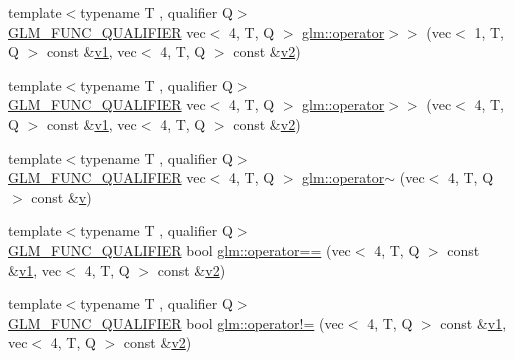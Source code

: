 \begin{DoxyCompactItemize}
\item 
{\footnotesize template$<$typename T , qualifier Q$>$ }\\\mbox{\hyperlink{setup_8hpp_a33fdea6f91c5f834105f7415e2a64407}{G\+L\+M\+\_\+\+F\+U\+N\+C\+\_\+\+Q\+U\+A\+L\+I\+F\+I\+ER}} vec$<$ 4, T, Q $>$ \mbox{\hyperlink{namespaceglm_a30d2494740db3a57a74b7ebe9339b5d0}{glm\+::operator$>$$>$}} (vec$<$ 1, T, Q $>$ const \&\mbox{\hyperlink{_s_d_l__opengl__glext_8h_a435c176a02c061b43e19bdf7c86cceae}{v1}}, vec$<$ 4, T, Q $>$ const \&\mbox{\hyperlink{_s_d_l__opengl__glext_8h_a0928f6d0f0f794ba000a21dfae422136}{v2}})
\item 
{\footnotesize template$<$typename T , qualifier Q$>$ }\\\mbox{\hyperlink{setup_8hpp_a33fdea6f91c5f834105f7415e2a64407}{G\+L\+M\+\_\+\+F\+U\+N\+C\+\_\+\+Q\+U\+A\+L\+I\+F\+I\+ER}} vec$<$ 4, T, Q $>$ \mbox{\hyperlink{namespaceglm_a8cc622e034537762d4d2355a4caeddb2}{glm\+::operator$>$$>$}} (vec$<$ 4, T, Q $>$ const \&\mbox{\hyperlink{_s_d_l__opengl__glext_8h_a435c176a02c061b43e19bdf7c86cceae}{v1}}, vec$<$ 4, T, Q $>$ const \&\mbox{\hyperlink{_s_d_l__opengl__glext_8h_a0928f6d0f0f794ba000a21dfae422136}{v2}})
\item 
{\footnotesize template$<$typename T , qualifier Q$>$ }\\\mbox{\hyperlink{setup_8hpp_a33fdea6f91c5f834105f7415e2a64407}{G\+L\+M\+\_\+\+F\+U\+N\+C\+\_\+\+Q\+U\+A\+L\+I\+F\+I\+ER}} vec$<$ 4, T, Q $>$ \mbox{\hyperlink{namespaceglm_ad0636281215bc27c556dd4f4b990d4ad}{glm\+::operator$\sim$}} (vec$<$ 4, T, Q $>$ const \&\mbox{\hyperlink{_s_d_l__opengl_8h_a10a82eabcb59d2fcd74acee063775f90}{v}})
\item 
{\footnotesize template$<$typename T , qualifier Q$>$ }\\\mbox{\hyperlink{setup_8hpp_a33fdea6f91c5f834105f7415e2a64407}{G\+L\+M\+\_\+\+F\+U\+N\+C\+\_\+\+Q\+U\+A\+L\+I\+F\+I\+ER}} bool \mbox{\hyperlink{namespaceglm_abd1d976d30699701eee8eb2a1544762f}{glm\+::operator==}} (vec$<$ 4, T, Q $>$ const \&\mbox{\hyperlink{_s_d_l__opengl__glext_8h_a435c176a02c061b43e19bdf7c86cceae}{v1}}, vec$<$ 4, T, Q $>$ const \&\mbox{\hyperlink{_s_d_l__opengl__glext_8h_a0928f6d0f0f794ba000a21dfae422136}{v2}})
\item 
{\footnotesize template$<$typename T , qualifier Q$>$ }\\\mbox{\hyperlink{setup_8hpp_a33fdea6f91c5f834105f7415e2a64407}{G\+L\+M\+\_\+\+F\+U\+N\+C\+\_\+\+Q\+U\+A\+L\+I\+F\+I\+ER}} bool \mbox{\hyperlink{namespaceglm_a76e66f433342ec4244e55cb8def7a6d4}{glm\+::operator!=}} (vec$<$ 4, T, Q $>$ const \&\mbox{\hyperlink{_s_d_l__opengl__glext_8h_a435c176a02c061b43e19bdf7c86cceae}{v1}}, vec$<$ 4, T, Q $>$ const \&\mbox{\hyperlink{_s_d_l__opengl__glext_8h_a0928f6d0f0f794ba000a21dfae422136}{v2}})

\end{DoxyCompactItemize}
